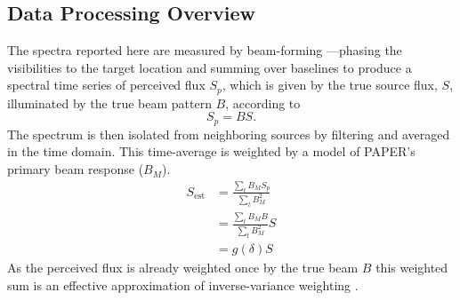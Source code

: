 \documentclass[preprint]{aastex}
\begin{document}

\subsection*{Data Processing Overview}
\label{sec:data_overview}
The spectra reported here are measured by beam-forming ---phasing the visibilities to
the target location and summing over baselines to produce a spectral time series of perceived flux $S_p$,
which is given by the true source flux, $S$, illuminated by the true beam pattern $B$, according to
\begin{equation}
S_p=BS.
\end{equation}
The spectrum is then isolated
from neighboring sources by filtering and averaged in the time domain.  This time-average is 
weighted by a model of PAPER's primary beam response ($B_M$).  
\begin{align}
S_\textrm{est} &= \frac{\sum_t B_M S_p}{\sum_t B^2_M} \nonumber \\ 
&= \frac{\sum_t B_M B}{\sum_t B^2_M} S  \nonumber \\
&= g(\delta) S  \label{eq:g}
\end{align}
As the perceived flux is already weighted once by the true beam $B$ this weighted sum is an effective approximation of inverse-variance weighting \citep{Pober:2012p8800}. 
\end{document}
